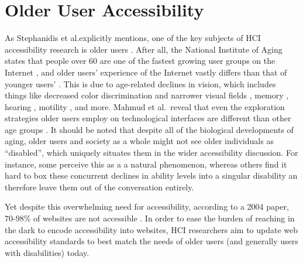 \documentclass[12pt,twoside]{reedthesis}
\begin{document}
\section{Older User Accessibility}\label{2.2}
    As Stephanidis et al.\@ explicitly mentions, one of the key subjects of HCI accessibility research is older users \cite{stephanidis_seven_2019}. After all, the National Institute of Aging states that people over 60 are one of the fastest growing user groups on the Internet \cite{kurniawan_research-derived_2005}, and older users' experience of the Internet vastly differs than that of younger users' \cite{stephanidis_seven_2019}. This is due to age-related declines in vision, which includes things like decreased color discrimination and narrower visual fields \cite{ganor_designing_nodate, cruz_user-centered_2023, lindberg_how_2006, noauthor_section508gov_nodate, noauthor_section508gov_nodate-1}, memory \cite{ganor_designing_nodate, noauthor_section508gov_nodate, noauthor_section508gov_nodate-1}, hearing \cite{noauthor_section508gov_nodate, noauthor_section508gov_nodate-1, cruz_user-centered_2023}, motility \cite{noauthor_section508gov_nodate, noauthor_section508gov_nodate-1, cruz_user-centered_2023, putnam_it_2023}, and more. Mahmud et al.~reveal that even the exploration strategies older users employ on technological interfaces are different than other age groups \cite{mahmud_learning_2020}. It should be noted that despite all of the biological developments of aging, older users and society as a whole might not see older individuals as \enquote{disabled}, which uniquely situates them in the wider accessibility discussion. For instance, some perceive this as a a natural phenomenon, whereas others find it hard to box these concurrent declines in ability levels into a singular disability an therefore leave them out of the conversation entirely.

    Yet despite this overwhelming need for accessibility, according to a 2004 paper, 70-98\% of websites are not accessible \cite{lazar_improving_2004}. In order to ease the burden of reaching in the dark to encode accessibility into websites, HCI researchers aim to update web accessibility standards to best match the needs of older users (and generally users with disabilities) today.
    
\end{document}
